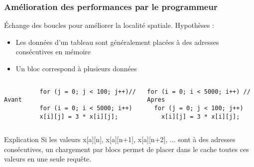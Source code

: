 %

\begin{frame}[fragile]\frametitle{Amélioration des performances par le programmeur}
  
  \begin{block}{}
    Échange des boucles pour améliorer la localité spatiale. Hypothèses :
    \begin{itemize}
    \item Les données d'un tableau sont généralement placées à des
      adresses consécutives en mémoire
    \item Un bloc correspond à plusieurs données
    \end{itemize}
  \end{block}   
  
  \vspace{-0,7cm}
  
  \begin{columns}[t]
    \begin{column}{6cm} %
      \begin{block}{}
        \begin{lstlisting}
          for (j = 0; j < 100; j++)// Avant
          for (i = 0; i < 5000; i++)
          x[i][j] = 3 * x[i][j];
\end{lstlisting}
\end{block} 
 \end{column}
    
 \begin{column}{6cm} %
   \begin{block}{}
\begin{lstlisting}
for (i = 0; i < 5000; i++) // Apres
  for (j = 0; j < 100; j++)
    x[i][j] = 3 * x[i][j];
\end{lstlisting}
\end{block}
\end{column}
\end{columns}  


\begin{alertblock}{Explication}
  Si les valeurs x[a][n], x[a][n+1], x[a][n+2],
  ... sont à des adresses consécutives, un chargement par
  blocs permet de placer dans le cache toutes ces valeurs
  en une seule requête.
\end{alertblock}   
        

\end{frame}


